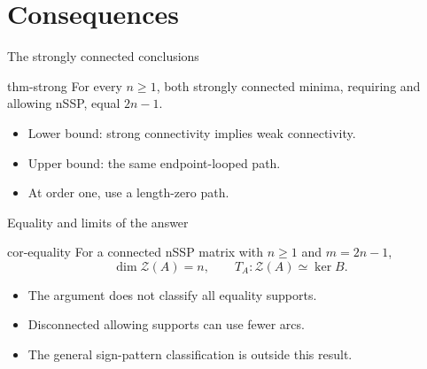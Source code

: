 \documentclass{beamer}
\begin{document}
\section{Consequences}
\begin{frame}{The strongly connected conclusions}
\begin{bookresult}{thm-strong}
For every $n\geq1$, both strongly connected minima, requiring and allowing nSSP, equal $2n-1$.
\end{bookresult}
\begin{itemize}
\item Lower bound: strong connectivity implies weak connectivity.
\item Upper bound: the same endpoint-looped path.
\item At order one, use a length-zero path.
\end{itemize}
\end{frame}
\begin{frame}{Equality and limits of the answer}
\begin{bookresult}{cor-equality}
For a connected nSSP matrix with $n\geq1$ and $m=2n-1$,
\[
 \dim\mathcal Z(A)=n,\qquad T_A:\mathcal Z(A)\simeq\ker B.
\]
\end{bookresult}
\begin{itemize}
\item The argument does not classify all equality supports.
\item Disconnected allowing supports can use fewer arcs.
\item The general sign-pattern classification is outside this result.
\end{itemize}
\end{frame}
\end{document}
